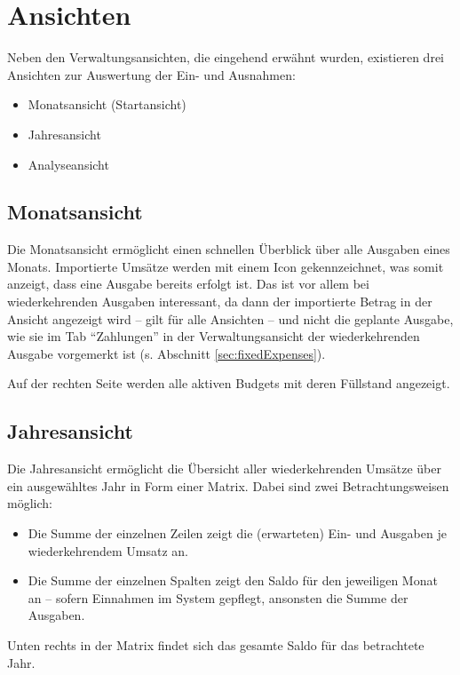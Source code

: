 \chapter{Ansichten}

Neben den Verwaltungsansichten, die eingehend erwähnt wurden, existieren drei Ansichten zur Auswertung der Ein- und Ausnahmen:

\begin{itemize}[nosep]
	\item Monatsansicht (Startansicht)
	\item Jahresansicht
	\item Analyseansicht
\end{itemize}

\section{Monatsansicht}

Die Monatsansicht ermöglicht einen schnellen Überblick über alle Ausgaben eines Monats. Importierte Umsätze werden mit einem Icon gekennzeichnet, was somit anzeigt, dass eine Ausgabe bereits erfolgt ist. Das ist vor allem bei wiederkehrenden Ausgaben interessant, da dann der importierte Betrag in der Ansicht angezeigt wird -- gilt für alle Ansichten -- und nicht die geplante Ausgabe, wie sie im Tab "`Zahlungen"' in der Verwaltungsansicht der wiederkehrenden Ausgabe vorgemerkt ist (s. Abschnitt \ref{sec:fixedExpenses}).

Auf der rechten Seite werden alle aktiven Budgets mit deren Füllstand angezeigt.

\section{Jahresansicht}

Die Jahresansicht ermöglicht die Übersicht aller wiederkehrenden Umsätze über ein ausgewähltes Jahr in Form einer Matrix. Dabei sind zwei Betrachtungsweisen möglich:

\begin{itemize}[nosep]
	\item Die Summe der einzelnen Zeilen zeigt die (erwarteten) Ein- und Ausgaben je wiederkehrendem Umsatz an. 
	\item Die Summe der einzelnen Spalten zeigt den Saldo für den jeweiligen Monat an -- sofern Einnahmen im System gepflegt, ansonsten die Summe der Ausgaben.
\end{itemize}

Unten rechts in der Matrix findet sich das gesamte Saldo für das betrachtete Jahr. 

